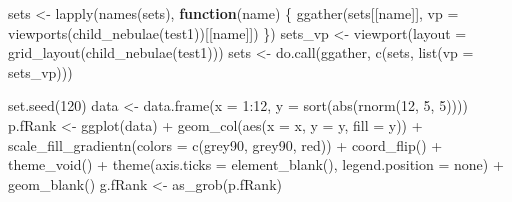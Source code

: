 \documentclass[
]{article}
\newenvironment{Shaded}{\begin{snugshade}}{\end{snugshade}}
\newcommand{\AttributeTok}[1]{\textcolor[rgb]{0.77,0.63,0.00}{#1}}
\newcommand{\ControlFlowTok}[1]{\textcolor[rgb]{0.13,0.29,0.53}{\textbf{#1}}}
\newcommand{\DecValTok}[1]{\textcolor[rgb]{0.00,0.00,0.81}{#1}}
\newcommand{\FunctionTok}[1]{\textcolor[rgb]{0.00,0.00,0.00}{#1}}
\newcommand{\NormalTok}[1]{#1}
\newcommand{\OtherTok}[1]{\textcolor[rgb]{0.56,0.35,0.01}{#1}}
\newcommand{\SpecialCharTok}[1]{\textcolor[rgb]{0.00,0.00,0.00}{#1}}
\newcommand{\StringTok}[1]{\textcolor[rgb]{0.31,0.60,0.02}{#1}}
\begin{document}
\begin{Shaded}
\begin{Highlighting}[]
\NormalTok{sets }\OtherTok{\textless{}{-}} \FunctionTok{lapply}\NormalTok{(}\FunctionTok{names}\NormalTok{(sets),}
  \ControlFlowTok{function}\NormalTok{(name) \{}
    \FunctionTok{ggather}\NormalTok{(sets[[name]],}
      \AttributeTok{vp =} \FunctionTok{viewports}\NormalTok{(}\FunctionTok{child\_nebulae}\NormalTok{(test1))[[name]])}
\NormalTok{  \})}
\NormalTok{sets\_vp }\OtherTok{\textless{}{-}} \FunctionTok{viewport}\NormalTok{(}\AttributeTok{layout =} \FunctionTok{grid\_layout}\NormalTok{(}\FunctionTok{child\_nebulae}\NormalTok{(test1)))}
\NormalTok{sets }\OtherTok{\textless{}{-}} \FunctionTok{do.call}\NormalTok{(ggather, }\FunctionTok{c}\NormalTok{(sets, }\FunctionTok{list}\NormalTok{(}\AttributeTok{vp =}\NormalTok{ sets\_vp)))}

\FunctionTok{set.seed}\NormalTok{(}\DecValTok{120}\NormalTok{)}
\NormalTok{data }\OtherTok{\textless{}{-}} \FunctionTok{data.frame}\NormalTok{(}\AttributeTok{x =} \DecValTok{1}\SpecialCharTok{:}\DecValTok{12}\NormalTok{, }\AttributeTok{y =} \FunctionTok{sort}\NormalTok{(}\FunctionTok{abs}\NormalTok{(}\FunctionTok{rnorm}\NormalTok{(}\DecValTok{12}\NormalTok{, }\DecValTok{5}\NormalTok{, }\DecValTok{5}\NormalTok{))))}
\NormalTok{p.fRank }\OtherTok{\textless{}{-}} \FunctionTok{ggplot}\NormalTok{(data) }\SpecialCharTok{+}
  \FunctionTok{geom\_col}\NormalTok{(}\FunctionTok{aes}\NormalTok{(}\AttributeTok{x =}\NormalTok{ x, }\AttributeTok{y =}\NormalTok{ y, }\AttributeTok{fill =}\NormalTok{ y)) }\SpecialCharTok{+}
  \FunctionTok{scale\_fill\_gradientn}\NormalTok{(}\AttributeTok{colors =} \FunctionTok{c}\NormalTok{(}\StringTok{\textquotesingle{}grey90\textquotesingle{}}\NormalTok{, }\StringTok{\textquotesingle{}grey90\textquotesingle{}}\NormalTok{, }\StringTok{\textquotesingle{}red\textquotesingle{}}\NormalTok{)) }\SpecialCharTok{+}
  \FunctionTok{coord\_flip}\NormalTok{() }\SpecialCharTok{+}
  \FunctionTok{theme\_void}\NormalTok{() }\SpecialCharTok{+}
  \FunctionTok{theme}\NormalTok{(}\AttributeTok{axis.ticks =} \FunctionTok{element\_blank}\NormalTok{(),}
    \AttributeTok{legend.position =} \StringTok{\textquotesingle{}none\textquotesingle{}}\NormalTok{) }\SpecialCharTok{+}
  \FunctionTok{geom\_blank}\NormalTok{()}
\NormalTok{g.fRank }\OtherTok{\textless{}{-}} \FunctionTok{as\_grob}\NormalTok{(p.fRank)}


\end{Highlighting}
\end{Shaded}
\end{document}
